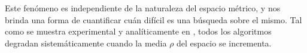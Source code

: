 Este fen\'omeno es independiente de la naturaleza del espacio m\'etrico,  y nos brinda una forma de cuantificar cu\'an dif\'icil es una b\'usqueda sobre el mismo. Tal como se muestra experimental y anal\'iticamente en \cite{oursurvey}, todos los algoritmos degradan  sistem\'aticamente cuando la media $\rho$ del espacio se incrementa.\\